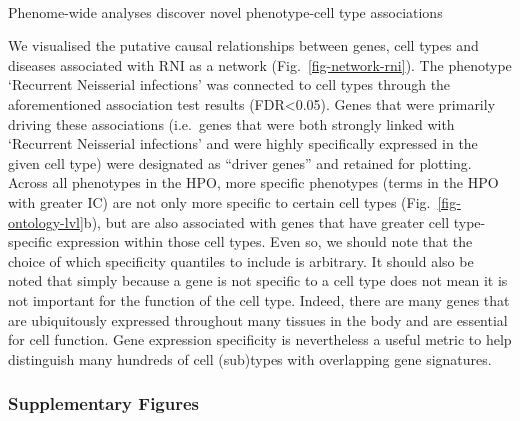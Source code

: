 \documentclass[
]{article}
\makeatletter
\let\oldparagraph\paragraph
\renewcommand{\paragraph}{
    \@ifstar
      \xxxParagraphStar
      \xxxParagraphNoStar
  }
\newcommand{\xxxParagraphStar}[1]{\oldparagraph*{#1}\mbox{}}
\newcommand{\xxxParagraphNoStar}[1]{\oldparagraph{#1}\mbox{}}
\makeatother
\begin{document}
\paragraph{Phenome-wide analyses discover novel phenotype-cell type
associations}\label{phenome-wide-analyses-discover-novel-phenotype-cell-type-associations-1}

We visualised the putative causal relationships between genes, cell
types and diseases associated with RNI as a network
(Fig.~\ref{fig-network-rni}). The phenotype `Recurrent Neisserial
infections' was connected to cell types through the aforementioned
association test results (FDR\textless0.05). Genes that were primarily
driving these associations (i.e.~genes that were both strongly linked
with `Recurrent Neisserial infections' and were highly specifically
expressed in the given cell type) were designated as ``driver genes''
and retained for plotting. Across all phenotypes in the HPO, more
specific phenotypes (terms in the HPO with greater IC) are not only more
specific to certain cell types (Fig.~\ref{fig-ontology-lvl}b), but are
also associated with genes that have greater cell type-specific
expression within those cell types. Even so, we should note that the
choice of which specificity quantiles to include is arbitrary. It should
also be noted that simply because a gene is not specific to a cell type
does not mean it is not important for the function of the cell type.
Indeed, there are many genes that are ubiquitously expressed throughout
many tissues in the body and are essential for cell function. Gene
expression specificity is nevertheless a useful metric to help
distinguish many hundreds of cell (sub)types with overlapping gene
signatures.

\subsubsection{Supplementary Figures}\label{supplementary-figures}
\end{document}
